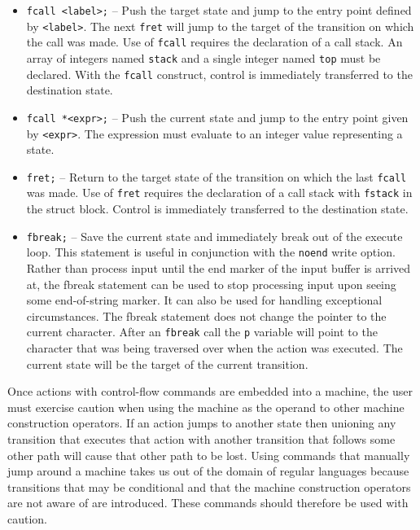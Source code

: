 \documentclass[letterpaper,11pt,oneside]{book}
\begin{document}
\begin{itemize}
\item \verb|fcall <label>;| -- Push the target state and jump to the entry
point defined by \verb|<label>|.  The next \verb|fret| will jump to the target
of the transition on which the call was made. Use of \verb|fcall| requires
the declaration of a call stack. An array of integers named \verb|stack| and a
single integer named \verb|top| must be declared. With the \verb|fcall|
construct, control is immediately transferred to the destination state.

\item \verb|fcall *<expr>;| -- Push the current state and jump to the entry
point given by \verb|<expr>|. The expression must evaluate to an integer value
representing a state.

\item \verb|fret;| -- Return to the target state of the transition on which the
last \verb|fcall| was made.  Use of \verb|fret| requires the declaration of a
call stack with \verb|fstack| in the struct block.  Control is immediately
transferred to the destination state.

\item \verb|fbreak;| -- Save the current state and immediately break out of the
execute loop. This statement is useful in conjunction with the \verb|noend|
write option. Rather than process input until the end marker of the input
buffer is arrived at, the fbreak statement can be used to stop processing input
upon seeing some end-of-string marker.  It can also be used for handling
exceptional circumstances.  The fbreak statement does not change the pointer to
the current character. After an \verb|fbreak| call the \verb|p| variable will point to
the character that was being traversed over when the action was
executed. The current state will be the target of the current transition.

\end{itemize}

 Once actions with control-flow commands are embedded into a
machine, the user must exercise caution when using the machine as the operand
to other machine construction operators. If an action jumps to another state
then unioning any transition that executes that action with another transition
that follows some other path will cause that other path to be lost. Using
commands that manually jump around a machine takes us out of the domain of
regular languages because transitions that may be conditional and that the
machine construction operators are not aware of are introduced.  These
commands should therefore be used with caution.
\end{document}
